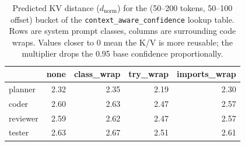 \begin{table}[t]
\centering
\small
\caption{Predicted KV distance (\(d_{\text{norm}}\)) for the (50--200 tokens, 50--100 offset) bucket of the \texttt{context\_aware\_confidence} lookup table. Rows are system prompt classes, columns are surrounding code wraps. Values closer to 0 mean the K/V is more reusable; the multiplier drops the 0.95 base confidence proportionally.}\label{tab:predicted-distance-50-100}
\begin{tabular}{l|rrrr}
\toprule
 & none & class\_wrap & try\_wrap & imports\_wrap \\
\midrule
planner & 2.32 & 2.35 & 2.19 & 2.30 \\
coder & 2.60 & 2.63 & 2.47 & 2.57 \\
reviewer & 2.59 & 2.62 & 2.47 & 2.57 \\
tester & 2.63 & 2.67 & 2.51 & 2.61 \\
\bottomrule
\end{tabular}
\end{table}